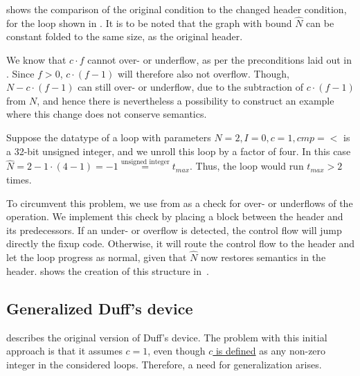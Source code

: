  shows the comparison of the original condition to the changed header condition, for the loop shown in .
It is to be noted that the graph with bound $\hat{N}$ can be constant folded to the same size, as the original header.





We know that $c \cdot f$ cannot over- or underflow, as per the preconditions laid out in .
Since $f > 0$, $c \cdot (f - 1)$ will therefore also not overflow.
Though, $N - c \cdot (f - 1)$ can still over- or underflow, due to the subtraction of $c \cdot (f - 1)$ from $N$, and hence there is nevertheless a possibility to construct an example where this change does not conserve semantics.

Suppose the datatype of a loop with parameters $N = 2, I = 0, c = 1, cmp = <$ is a 32-bit unsigned integer, and we unroll this loop by a factor of four.
In this case $\hat{N} = 2 - 1 \cdot (4 - 1) = -1 \overset{\text{unsigned integer}}{=} t_{max}$.
Thus, the loop would run $t_{max} > 2$ times.

To circumvent this problem, we use  from  as a check for over- or underflows of the operation.
We implement this check by placing a block between the header and its predecessors.
If an under- or overflow is detected, the control flow will jump directly the fixup code.
Otherwise, it will route the control flow to the header and let the loop progress as normal, given that $\hat{N}$ now restores semantics in the header.
 shows the creation of this structure in~\libFIRM.



\newpage

\subsection{Generalized Duff's device}\label{sec:impl:fixup:duff}

 describes the original version of Duff's device.
The problem with this initial approach is that it assumes $c = 1$, even though \hyperref[sec:impl::def-c]{$c$ is defined} as any non-zero integer in the considered loops.
Therefore, a need for generalization arises.

